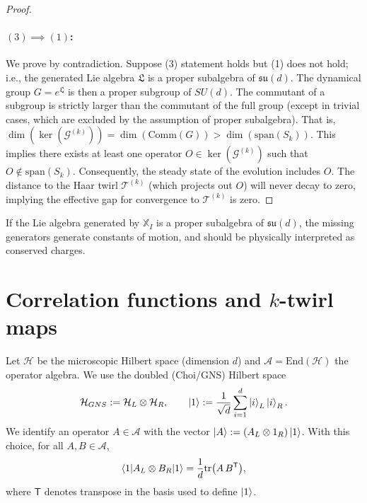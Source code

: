 \documentclass{article}
\theoremstyle{definition}
\newcommand{\mA}{\mathcal{A}}
\newcommand{\mH}{\mathcal{H}}
\newcommand{\tr}{\text{tr}}
\begin{document}
\begin{proof}
        \paragraph{$(3) \implies (1)$:}
        We prove by contradiction. Suppose (3) statement holds but (1) does not
        hold; i.e., the generated Lie algebra $\mathfrak{L}$ is a proper subalgebra
        of $\mathfrak{su}(d)$. The dynamical group $G = e^{\mathfrak{L}}$ is
        then a proper subgroup of $SU(d)$. The commutant of a subgroup is strictly
        larger than the commutant of the full group (except in trivial cases, which
        are excluded by the assumption of proper subalgebra). That is,
        $\dim(\ker(\mathcal{G}^{(k)})) = \dim(\text{Comm}(G)) > \dim(\text{span}(
        S_{k}))$. This implies there exists at least one operator $O \in \ker(\mathcal{G}
        ^{(k)})$ such that $O \notin \text{span}(S_{k})$. Consequently, the steady
        state of the evolution includes $O$. The distance to the Haar twirl
        $\mathcal{T}^{(k)}$ (which projects out $O$) will never decay to zero, implying
        the effective gap for convergence to $\mathcal{T}^{(k)}$ is zero.
    \end{proof}
    If the Lie algebra generated by $\mathbb{X}_{I}$ is a proper subalgebra of $\mathfrak{su}
    (d)$, the missing generators generate constants of motion, and should be physically
    interpreted as conserved charges.

    

\appendix


    \section{Correlation functions and $k$-twirl maps}

    Let $\mH$ be the microscopic Hilbert space (dimension $d$) and $\mA=\mathrm{End}
    (\mH)$ the operator algebra. We use the doubled (Choi/GNS) Hilbert space
    \begin{equation}
        \mH_{GNS}:=\mH_{L}\otimes \mH_{R}, \qquad \ket{1}:=\frac{1}{\sqrt{d}}\sum
        _{i=1}^{d}\ket{i}_{L}\ket{i}_{R}.
    \end{equation}
    We identify an operator $A\in\mA$ with the vector
    $\ket{A}:=(A_{L}\otimes 1_{R})\ket{1}$. With this choice, for all
    $A,B\in\mA$,
    \begin{equation}
        \braket{1|A_L\otimes B_R|1}=\frac{1}{d}\tr\big(A\,B^{\mathsf{T}}\big),
    \end{equation}
    where $\mathsf{T}$ denotes transpose in the basis used to define $\ket{1}$.
\end{document}

